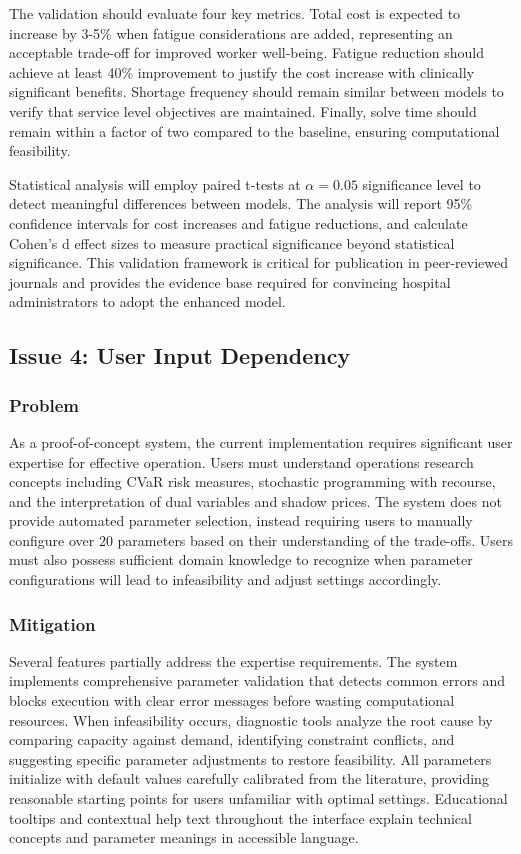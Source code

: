 \documentclass[11pt,letterpaper]{article}
\begin{document}
The validation should evaluate four key metrics. Total cost is expected to increase by 3-5\% when fatigue considerations are added, representing an acceptable trade-off for improved worker well-being. Fatigue reduction should achieve at least 40\% improvement to justify the cost increase with clinically significant benefits. Shortage frequency should remain similar between models to verify that service level objectives are maintained. Finally, solve time should remain within a factor of two compared to the baseline, ensuring computational feasibility.

Statistical analysis will employ paired t-tests at $\alpha = 0.05$ significance level to detect meaningful differences between models. The analysis will report 95\% confidence intervals for cost increases and fatigue reductions, and calculate Cohen's d effect sizes to measure practical significance beyond statistical significance. This validation framework is critical for publication in peer-reviewed journals and provides the evidence base required for convincing hospital administrators to adopt the enhanced model.

\subsection{Issue 4: User Input Dependency}

\subsubsection{Problem}
As a proof-of-concept system, the current implementation requires significant user expertise for effective operation. Users must understand operations research concepts including CVaR risk measures, stochastic programming with recourse, and the interpretation of dual variables and shadow prices. The system does not provide automated parameter selection, instead requiring users to manually configure over 20 parameters based on their understanding of the trade-offs. Users must also possess sufficient domain knowledge to recognize when parameter configurations will lead to infeasibility and adjust settings accordingly.

\subsubsection{Mitigation}
Several features partially address the expertise requirements. The system implements comprehensive parameter validation that detects common errors and blocks execution with clear error messages before wasting computational resources. When infeasibility occurs, diagnostic tools analyze the root cause by comparing capacity against demand, identifying constraint conflicts, and suggesting specific parameter adjustments to restore feasibility. All parameters initialize with default values carefully calibrated from the literature, providing reasonable starting points for users unfamiliar with optimal settings. Educational tooltips and contextual help text throughout the interface explain technical concepts and parameter meanings in accessible language.
\end{document}
